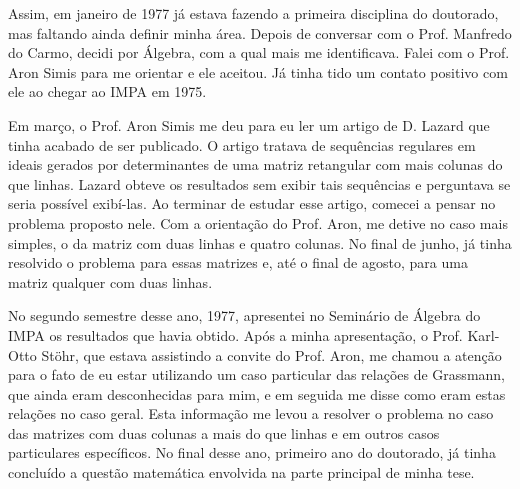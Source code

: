 \documentclass{hipatia}
\begin{document}
Assim, em janeiro de 1977 já estava fazendo a primeira
disciplina do doutorado, mas faltando ainda definir minha
área. Depois de conversar com o Prof. Manfredo do Carmo,
decidi por Álgebra, com a qual mais me identificava. Falei
com o Prof. Aron Simis para me orientar e ele aceitou. Já
tinha tido um contato positivo com ele ao chegar ao IMPA em
1975.

Em março, o Prof. Aron Simis me deu para eu ler um artigo de
D. Lazard que tinha acabado de ser publicado. O artigo
tratava de sequências regulares em ideais gerados por
determinantes de uma matriz retangular com mais colunas do que %
linhas. Lazard obteve os resultados sem exibir tais
sequências e perguntava se seria possível exibí-las. Ao
terminar de estudar %
esse %
artigo, comecei a pensar no problema
proposto nele. Com a orientação do Prof. Aron, me
detive no caso mais simples, o da matriz com duas linhas e
quatro colunas. No final de junho, já tinha resolvido o
problema para essas matrizes e, até o final de agosto, para
uma matriz qualquer com duas linhas.

No segundo semestre desse ano, 1977, apresentei no Seminário
de Álgebra do IMPA os resultados que %
havia %
obtido. Após a
minha apresentação, o Prof. Karl-Otto Stöhr, que estava
assistindo a convite do Prof. Aron, me chamou a atenção para
o fato de eu estar utilizando um caso particular das
relações de Grassmann, que ainda eram desconhecidas para
mim, e em seguida me disse como eram estas relações no caso
geral. Esta informação me levou a resolver o problema no
caso das matrizes com %
duas colunas
a mais do %
que linhas e em
outros casos particulares específicos. No final desse ano,
primeiro ano do doutorado, já tinha concluído a questão
matemática envolvida na parte principal de minha tese.
\end{document}
